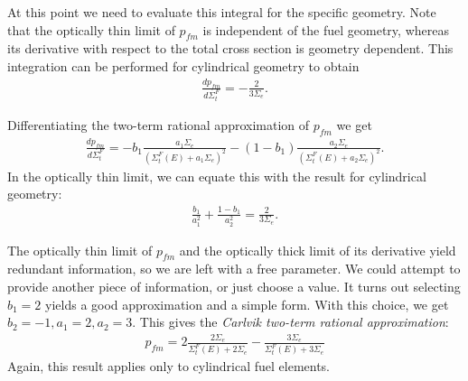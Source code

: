 At this point we need to evaluate this integral for the specific geometry. Note that the optically thin limit of $p_{fm}$ is independent of the fuel geometry, whereas its derivative with respect to the total cross section is geometry dependent. This integration can be performed for cylindrical geometry to obtain
\begin{align}
  \frac{d p_{fm} }{d\Sigma_t^F}  = -\frac{2}{3 \Sigma_e} .
\end{align}

Differentiating the two-term rational approximation of $p_{fm}$ we get
\begin{align}
  \frac{d p_{fm} }{d\Sigma_t^F} = -b_1 \frac{ a_1 \Sigma_e }{ ( \Sigma_t^F(E) + a_1 \Sigma_e )^2 } - ( 1 - b_1 ) \frac{ a_2 \Sigma_e }{ ( \Sigma_t^F(E) + a_2 \Sigma_e )^2 } .
\end{align}
In the optically thin limit, we can equate this with the result for cylindrical geometry:
\begin{align}
  \frac{b_1}{a_1^2} + \frac{ 1 - b_1 }{ a_2^2 } = \frac{2}{3 \Sigma_e} .
\end{align}

The optically thin limit of $p_{fm}$ and the optically thick limit of its derivative yield redundant information, so we are left with a free parameter. We could attempt to provide another piece of information, or just choose a value. It turns out selecting $b_1 = 2$ yields a good approximation and a simple form. With this choice, we get $b_2 = -1, a_1 = 2, a_2 = 3$. This gives the \emph{Carlvik two-term rational approximation}:
\begin{align}
  p_{fm} = 2 \frac{ 2 \Sigma_e }{ \Sigma_t^F(E) + 2 \Sigma_e } - \frac{ 3 \Sigma_e }{ \Sigma_t^F(E) + 3 \Sigma_e }
\end{align}
Again, this result applies only to cylindrical fuel elements.

